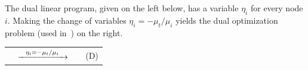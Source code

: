 \documentclass[11pt]{article}
\theoremstyle{definition}
\theoremstyle{definition}
\theoremstyle{definition}
\newcommand{\R}{\mathbb{R}}
\newcommand{\gij}{\gamma_{ij}}
\newif\ifLAYOUTA
\begin{document}
	The dual linear program, given on the left below, has a variable $\eta_i$ for
	every node $i$. 
	Making the change of variables $\eta_i = - \mu_t / \mu_i$ yields the
	dual optimization problem (used in~\cite{Olver2017}) on the right.
    
	\ifLAYOUTA
    \vspace{0.5cm}
	\else
    \vspace{-0.5cm}
	\fi

	\begin{tabular}{rcll}
		\label{eqn:dual}
		\hspace*{-1.05cm}
	\resizebox{0.37\textwidth}{!}{
		\fbox{
	\begin{minipage}{0.35\textwidth}
	\begin{alignat*}{4}
    \min &\quad &\sum_{i \in V \setminus t} b_i \eta_i \\
    \text{s.t.}
    &   &\gij \eta_j - \eta_i &\geq 0 \quad &&\forall\; &&(i, j) \in E \\
    &   &                     &             &&          &&\ i, j \neq t \\
    &   &\gamma_{ti} \eta_i &\geq -1 \quad  &&\forall\; &&(i, t) \in E \\
    &   &-\eta_i &\geq \gamma_{it} \quad    &&\forall\; &&(t, i) \in E \\
    &   &\eta_i &\leq 0 \quad               &&\forall\; &&i \in V \setminus t
    \end{alignat*}
	\end{minipage}
}
} & 
	$\xrightarrow{\hspace*{0.25cm}\eta_i = - \mu_t / \mu_i\hspace*{0.25cm}}$
	&
	\resizebox{0.37\textwidth}{!}{
		\fbox{
	\begin{minipage}{0.4\textwidth}
    \begin{alignat*}{3}
    \max &\quad &\mu_t \sum_{i \in V \setminus t} \frac{b_i}{\mu_i}  \\
    \text{s.t.}
    &   &\gij \mu_i &\leq \mu_j \quad &&\forall\; (i, j) \in E \\
    &   &\mu_i &\in \R_{>0} \cup \infty \quad &&\forall\; i \in V \setminus t \\
    &   &\mu_t &\in \R_{>0}
    \end{alignat*}
	\end{minipage}
}
} & \hspace*{0.4cm}(D)
\end{tabular}

\ifLAYOUTA
\newpage
\fi
        
\end{document}
